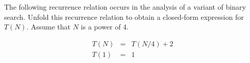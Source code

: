 The following recurrence relation occurs in the analysis of a variant
of binary search. Unfold this recurrence relation to obtain a
closed-form expression for $T(N)$.  Assume that $N$ is a power of 4.

\begin{eqnarray}
T(N) & = & T(N/4) + 2 \nonumber  \\
T(1) & = & 1 \nonumber
\end{eqnarray}
